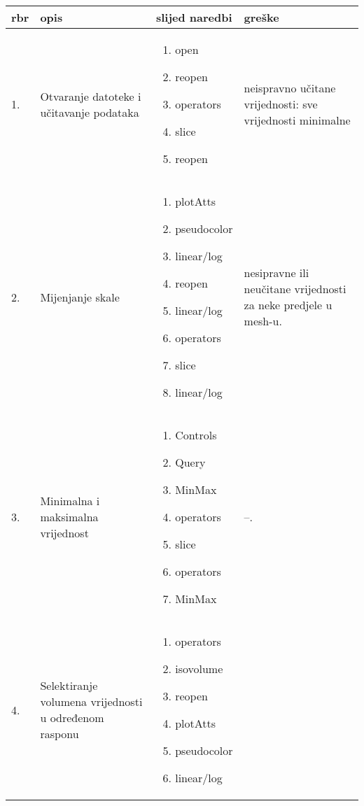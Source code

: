\documentclass[times, utf8, zavrsni]{fer}
\begin{document}
	\begin{longtable}{|l|p{80pt}|p{100pt}|p{120pt}|}
\hline
\textbf{rbr} & \textbf{opis} & \textbf{slijed naredbi} & \textbf{greške}\\
\hline
\endhead %
1. & Otvaranje datoteke i učitavanje podataka &
\begin{enumerate}
    \item open
    \item reopen
    \item operators
    \item slice
    \item reopen
\end{enumerate}
& neispravno učitane vrijednosti: sve vrijednosti minimalne\\
\hline
2. & Mijenjanje skale & \begin{enumerate}
    \item plotAtts
    \item pseudocolor
    \item linear/log
    \item reopen
    \item linear/log
    \item operators
    \item slice
    \item linear/log
\end{enumerate}
& nesipravne ili neučitane vrijednosti za neke predjele u mesh-u.\\
\hline
3. & Minimalna i maksimalna vrijednost & \begin{enumerate}
    \item Controls
    \item Query
    \item MinMax
    \item operators
    \item slice
    \item operators
    \item MinMax
\end{enumerate}
& --.\\
\hline
4. & Selektiranje volumena vrijednosti u određenom rasponu & \begin{enumerate}
    \item operators
    \item isovolume
    \item reopen
    \item plotAtts
    \item pseudocolor
    \item linear/log

\end{enumerate}
\end{longtable}
\end{document}
